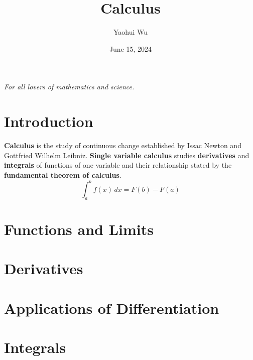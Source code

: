 \documentclass[12pt]{article}
\title{Calculus}
\author{Yaohui Wu}
\date{June 15, 2024}
\begin{document}
\maketitle

\begin{center}
    \textit{For all lovers of mathematics and science.}
\end{center}

\section*{Introduction}
\textbf{Calculus} is the study of continuous change established by Issac
Newton and Gottfried Wilhelm Leibniz.
\textbf{Single variable calculus} studies \textbf{derivatives} and
\textbf{integrals} of functions of one variable and their relationship stated
by the \textbf{fundamental theorem of calculus}.
\[\int_a^b f(x) \,dx = F(b)-F(a)\]

\tableofcontents

\newpage
\section{Functions and Limits}






\section{Derivatives}






\section{Applications of Differentiation}





\section{Integrals}




\end{document}
